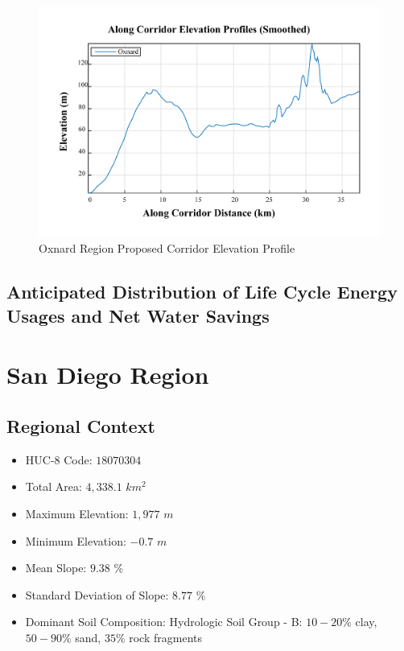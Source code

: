         \begin{figure}[!h]
            \begin{center}
            \includegraphics[width=5.5in]{figures/Oxnard_Elevation_Profile.png}
            \caption{Oxnard Region Proposed Corridor Elevation Profile}
            \label{fig:OelevationProfile}
            \end{center}
        \end{figure}
    
    \subsection{Anticipated Distribution of Life Cycle Energy Usages and Net Water Savings}    
    
\clearpage    
    
\section{San Diego Region}

    \subsection{Regional Context}
    
    \begin{itemize}
      \setlength{\itemsep}{0cm}
      \setlength{\parskip}{0cm}
        \item HUC-8 Code: $18070304$
        \item Total Area: $4,338.1$ $km^2$
        \item Maximum Elevation: $1,977$ $m$
        \item Minimum Elevation: $-0.7$ $m$
        \item Mean Slope: $9.38$ $\%$
        \item Standard Deviation of Slope: $8.77$ $\%$
        \item Dominant Soil Composition: Hydrologic Soil Group - B: $10-20\%$ clay, $50-90\%$ sand, $35\%$ rock fragments
    \end{itemize}
    
